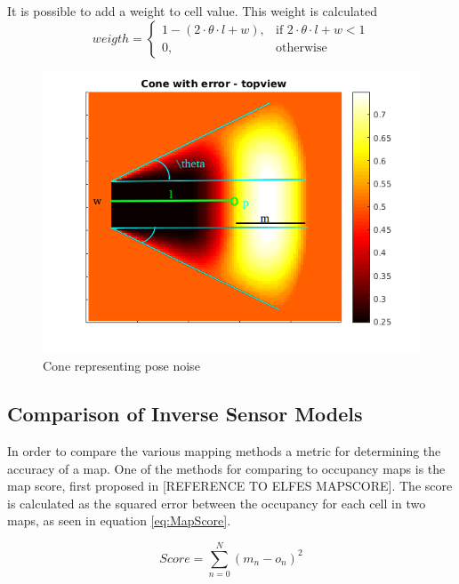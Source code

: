It is possible to add a weight to cell value. This weight is calculated
\begin{equation}
\label{eq:cone-weight}
weigth = 
\begin{cases}
1 - ( 2 \cdot \theta \cdot l + w), & \text{if } 2 \cdot \theta \cdot l + w < 1\\
0, & \text{otherwise}
\end{cases}
\end{equation}

\begin{figure}
	\centering
	\includegraphics[width=\textwidth]{figures/static_mapping/cone_noise_top}
	\caption{Cone representing pose noise}
	\label{fig:cone_with_noise_top}
\end{figure}



\subsection{Comparison of Inverse Sensor Models}
In order to compare the various mapping methods a metric for determining the accuracy of a map. One of the methods for comparing to occupancy maps is the map score, first proposed in [REFERENCE TO ELFES MAPSCORE]. The score is calculated as the squared error between the occupancy for each cell in two maps, as seen in equation \ref{eq:MapScore}.

\begin{equation}
\label{eq:MapScore}
Score = \sum_{n=0}^{N} (m_{n} - o_{n})^2
\end{equation}

